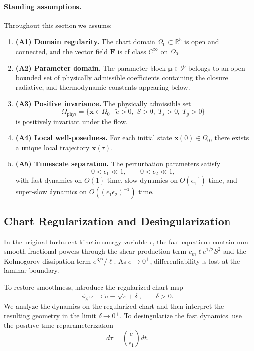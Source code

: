 \paragraph{Standing assumptions.}
Throughout this section we assume:
\begin{enumerate}
\item \textbf{(A1) Domain regularity.} The chart domain $\Omega_0 \subset \mathbb{R}^5$ is open and connected, and the vector field $\mathbf{F}$ is of class $C^\infty$ on $\Omega_0$.
\item \textbf{(A2) Parameter domain.} The parameter block $\boldsymbol{\mu} \in \mathcal{P}$ belongs to an open bounded set of physically admissible coefficients containing the closure, radiative, and thermodynamic constants appearing below.
\item \textbf{(A3) Positive invariance.} The physically admissible set
\begin{equation}
\Omega_{\mathrm{phys}}
= \{\mathbf{x} \in \Omega_0 \mid \tilde e > 0,\; S > 0,\; T_s > 0,\; T_g > 0\}
\end{equation}
is positively invariant under the flow.
\item \textbf{(A4) Local well-posedness.} For each initial state $\mathbf{x}(0) \in \Omega_0$, there exists a unique local trajectory $\mathbf{x}(\tau)$.
\item \textbf{(A5) Timescale separation.} The perturbation parameters satisfy
\begin{equation}
0 < \epsilon_1 \ll 1,
\qquad
0 < \epsilon_2 \ll 1,
\end{equation}
with fast dynamics on $O(1)$ time, slow dynamics on $O(\epsilon_1^{-1})$ time, and super-slow dynamics on $O((\epsilon_1\epsilon_2)^{-1})$ time.
\end{enumerate}

\subsection{Chart Regularization and Desingularization}

In the original turbulent kinetic energy variable $e$, the fast equations contain non-smooth fractional powers through the shear-production term $c_m \ell e^{1/2} S^2$ and the Kolmogorov dissipation term $e^{3/2}/\ell$. As $e \to 0^+$, differentiability is lost at the laminar boundary.

To restore smoothness, introduce the regularized chart map
\begin{equation}
\phi_\delta : e \mapsto \tilde e = \sqrt{e + \delta},
\qquad \delta > 0.
\end{equation}
We analyze the dynamics on the regularized chart and then interpret the resulting geometry in the limit $\delta \to 0^+$. To desingularize the fast dynamics, use the positive time reparameterization
\begin{equation}
d\tau = \left(\frac{\tilde e}{\epsilon_1}\right) dt.
\end{equation}

